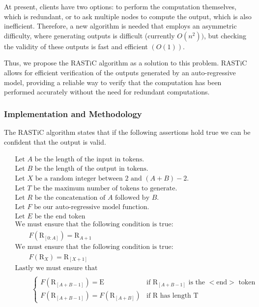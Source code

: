 \documentclass{article}
\begin{document}
At present, clients have two options: to perform the computation themselves, which is redundant, or to ask multiple nodes to compute the output, which is also inefficient. 
Therefore, a new algorithm is needed that employs an asymmetric difficulty, where generating outputs is difficult (currently $O(n^2))$, but checking the validity of these outputs is fast and efficient $(O(1))$.

Thus, we propose the \ac{RASTiC} algorithm as a solution to this problem.
\ac{RASTiC} allows for efficient verification of the outputs generated by an auto-regressive model, providing a reliable way to verify that the computation has been performed accurately without the need for redundant computations.
\subsubsection{Implementation and Methodology}
The \ac{RASTiC} algorithm states that if the following assertions hold true we can be confident that the output is valid.

\begin{align*}
    \begin{aligned}
        &\text{Let }A\text{ be the length of the input in tokens.}\\
        &\text{Let }B\text{ be the length of the output in tokens.}\\
        &\text{Let } X \text{ be a random integer between 2 and } (A + B) - 2. \\
        &\text{Let }T\text{ be the maximum number of tokens to generate.}\\
        &\text{Let }R\text{ be the concatenation of }A\text{ followed by }B.\\
        &\text{Let }F\text{ be our auto-regressive model function.}\\
        &\text{Let }E\text{ be the end token}\\
        &\text{We must ensure that the following condition is true:}\\
        &\qquad F(\text{R}_{[0:A]}) = \text{R}_{A+1} \\
        &\text{We must ensure that the following condition is true:} \\
        &\qquad F(\text{R}_X) = \text{R}_{[X+1]} \\
        &\text{Lastly we must ensure that} \\
        &\qquad \begin{aligned}
        \begin{cases}
            F(\text{R}_{[A+B-1]}) = \text{E} & \text{if } \text{R}_{[A+B-1]} \text{ is the }<\text{end}> \text{ token} \\
            F(\text{R}_{[A+B-1]}) = F(\text{R}_{[A+B]}) & \text{if } \text{R} \text{ has length } \text{T}
        \end{cases}
        \end{aligned}
    \end{aligned}
\end{align*}
\end{document}
